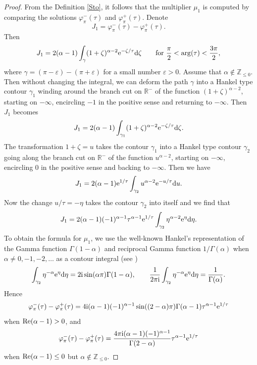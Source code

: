 \documentclass[pdftex]{sigma}
\numberwithin{equation}{section}
\begin{document}
 \begin{proof}
 From the Definition \ref{Sto}, it follows that the multiplier $\mu_1$ is computed by comparing the solutions
 $\varphi^{-}_{\pi}(\tau)$ and $\varphi^{+}_{\pi}(\tau)$. Denote
 \[
 J_1= \varphi^{-}_{\pi}(\tau) - \varphi^{+}_{\pi}(\tau) .
 \]
 Then
 \[
 J_1=
 2 (\alpha-1) \int_\gamma (1+\zeta)^{\alpha-2} {\rm e}^{-\zeta/\tau} {\rm d} \zeta\qquad {\rm for}\
 \frac{\pi}{2} < \arg (\tau) < \frac{3 \pi}{2} ,
 \]
 where $\gamma=(\pi-\varepsilon) - (\pi+\varepsilon)$ for a small number $\varepsilon > 0$. Assume that $\alpha\notin\mathbb{Z}_{\leq 0}$. Then
 without changing the integral, we can deform the path $\gamma$ into a Hankel type contour $\gamma_1$ winding around
 the branch cut on $\mathbb{R}^{-}$ of the function $(1+\zeta)^{\alpha-2}$, starting on $-\infty$, encircling $-1$ in the positive sense and returning to $-\infty$.
 Then $J_1$ becomes
 \[
 J_1=
 2 (\alpha-1) \int_{\gamma_1}
 (1+\zeta)^{\alpha-2} {\rm e}^{-\zeta/\tau} {\rm d} \zeta .
 \]
 The transformation $1+\zeta=u$ takes the contour $\gamma_1$ into a Hankel type contour $\gamma_2$ going along the branch cut
 on $\mathbb{R}^{-}$ of the function $u^{\alpha-2}$,
 starting on $-\infty$, encircling $0$ in the positive sense and backing to $-\infty$. Then we have
 \[
 J_1=
 2 (\alpha-1) {\rm e}^{1/\tau}\int_{\gamma_2}
 u^{\alpha-2} {\rm e}^{-u/\tau} {\rm d} u .
 \]
 Now the change $u/\tau=-\eta$ takes the contour $\gamma_2$ into itself and we find that
 \[
 J_1=
 2 (\alpha-1) (-1)^{\alpha-1} \tau^{\alpha-1} {\rm e}^{1/\tau}\int_{\gamma_2}
 \eta^{\alpha-2} {\rm e}^{\eta} {\rm d} \eta .
 \]
 To obtain the formula for $\mu_1$, we use the well-known Hankel's representation of the Gamma function $\Gamma(1-\alpha)$
 and reciprocal Gamma function $1/\Gamma(\alpha)$ when $\alpha\neq 0, -1, -2, \dots$
 as a contour integral (see \cite[1.6\,(1) and 1.6\,(2)]{BE})
 \begin{equation*}
 \int_{\gamma_2} \eta^{-\alpha} {\rm e}^{\eta} {\rm d} \eta=2 {\rm i} \sin (\alpha \pi) \Gamma(1-\alpha),\qquad
 \frac{1}{2 \pi {\rm i}} \int_{\gamma_2} \eta^{-\alpha} {\rm e}^{\eta} {\rm d} \eta=\frac{1}{\Gamma(\alpha)} .%
 \end{equation*}
 Hence
 \[
 \varphi^{-}_{\pi}(\tau) - \varphi^{+}_{\pi}(\tau)=
 4 {\rm i} (\alpha-1) (-1)^{\alpha-1} \sin((2-\alpha) \pi) \Gamma(\alpha-1)\tau^{\alpha-1} {\rm e}^{1/\tau}
 \]
 when ${\rm Re} (\alpha-1) > 0$, and
 \[
 \varphi^{-}_{\pi}(\tau) - \varphi^{+}_{\pi}(\tau)=
 \frac{4 \pi {\rm i} (\alpha-1) (-1)^{\alpha-1}}{\Gamma(2-\alpha)} \tau^{\alpha-1} {\rm e}^{1/\tau}
 \]
 when ${\rm Re} (\alpha-1) \leq 0$ but $\alpha\notin\mathbb{Z}_{\leq 0}$.


\end{proof}
\end{document}
